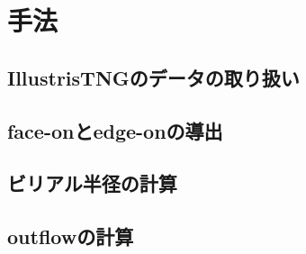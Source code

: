 \chapter{手法}

%

\section{IllustrisTNGのデータの取り扱い}

\section{face-onとedge-onの導出}

\section{ビリアル半径の計算}

\section{outflowの計算}